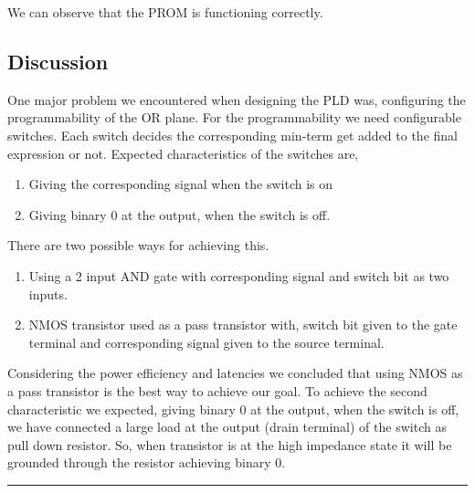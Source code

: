 \documentclass[a4paper,11pt]{article}%
\begin{document}
We can observe that the PROM is functioning correctly.

\subsection{Discussion}


One major problem we encountered when designing the PLD was, configuring the programmability of the OR plane. For the programmability we need configurable switches. Each switch decides the corresponding min-term get added to the final expression or not. Expected characteristics of the switches are,
\begin{enumerate}[\hspace{1cm}1.]
	\item Giving the corresponding signal when the switch is on
	\item Giving binary 0 at the output, when the switch is off.

\end{enumerate}
There are two possible ways for achieving this.
\begin{enumerate}[\hspace{1cm}1.]
	\item Using a 2 input AND gate with corresponding signal and switch bit as two inputs.
	\item NMOS transistor used as a pass transistor with, switch bit given to the gate terminal and corresponding signal given to the source terminal.

\end{enumerate}
Considering the power efficiency and latencies we concluded that using NMOS as a pass transistor is the best way to achieve our goal.
To achieve the second characteristic we expected, giving binary 0 at the output, when the switch is off, we have connected a large load at the output (drain terminal) of the switch as pull
down resistor. So, when transistor is at the high impedance state it will be grounded through the resistor achieving binary 0.\\
\vfill

\hrule
{


}
\end{document}
